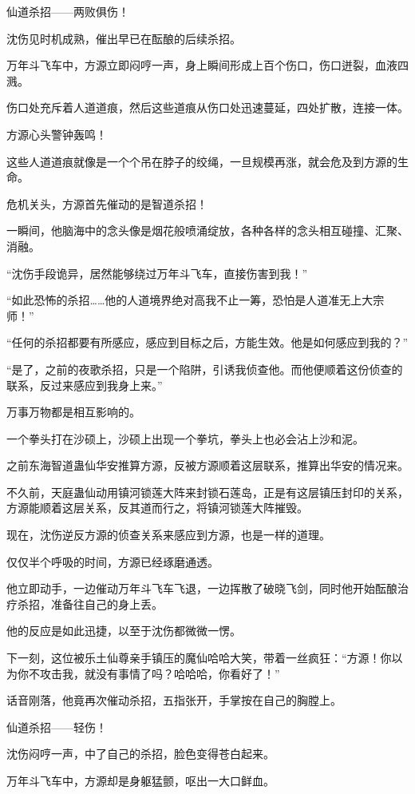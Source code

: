 \begin{this_body}
仙道杀招——两败俱伤！

沈伤见时机成熟，催出早已在酝酿的后续杀招。

万年斗飞车中，方源立即闷哼一声，身上瞬间形成上百个伤口，伤口迸裂，血液四溅。

伤口处充斥着人道道痕，然后这些道痕从伤口处迅速蔓延，四处扩散，连接一体。

方源心头警钟轰鸣！

这些人道道痕就像是一个个吊在脖子的绞绳，一旦规模再涨，就会危及到方源的生命。

危机关头，方源首先催动的是智道杀招！

一瞬间，他脑海中的念头像是烟花般喷涌绽放，各种各样的念头相互碰撞、汇聚、消融。

“沈伤手段诡异，居然能够绕过万年斗飞车，直接伤害到我！”

“如此恐怖的杀招……他的人道境界绝对高我不止一筹，恐怕是人道准无上大宗师！”

“任何的杀招都要有所感应，感应到目标之后，方能生效。他是如何感应到我的？”

“是了，之前的夜歌杀招，只是一个陷阱，引诱我侦查他。而他便顺着这份侦查的联系，反过来感应到我身上来。”

万事万物都是相互影响的。

一个拳头打在沙硕上，沙硕上出现一个拳坑，拳头上也必会沾上沙和泥。

之前东海智道蛊仙华安推算方源，反被方源顺着这层联系，推算出华安的情况来。

不久前，天庭蛊仙动用镇河锁莲大阵来封锁石莲岛，正是有这层镇压封印的关系，方源能顺着这层关系，反其道而行之，将镇河锁莲大阵摧毁。

现在，沈伤逆反方源的侦查关系来感应到方源，也是一样的道理。

仅仅半个呼吸的时间，方源已经琢磨通透。

他立即动手，一边催动万年斗飞车飞退，一边挥散了破晓飞剑，同时他开始酝酿治疗杀招，准备往自己的身上丢。

他的反应是如此迅捷，以至于沈伤都微微一愣。

下一刻，这位被乐土仙尊亲手镇压的魔仙哈哈大笑，带着一丝疯狂：“方源！你以为你不攻击我，就没有事情了吗？哈哈哈，你看好了！”

话音刚落，他竟再次催动杀招，五指张开，手掌按在自己的胸膛上。

仙道杀招——轻伤！

沈伤闷哼一声，中了自己的杀招，脸色变得苍白起来。

万年斗飞车中，方源却是身躯猛颤，呕出一大口鲜血。

\end{this_body}

